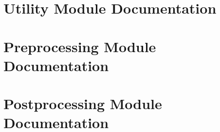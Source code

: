 \documentclass{book}
\begin{document}




























\chapter[Utility Modules]{Utility Module Documentation}\label{utilitymodules}





\chapter[Preprocessing Modules]{Preprocessing Module Documentation}\label{premodules}


\chapter[Postprocessing Modules]{Postprocessing Module Documentation}\label{postmodules}




\makeatletter\def\verbatim@font{\normalfont\ttfamily}\makeatother
\end{document}

